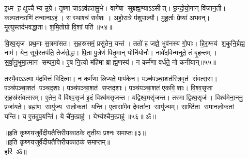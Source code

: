    इ॒ध्म ह॒ क्षुच्चैभ्य उ॒ग्रे।
   तृ॒ष्णा चाऽऽव॑हतामु॒भे।
   वागे॑षा सुब्रह्म॒ण्याऽऽसीत्।
   छ॒न्दो॒यो॒गान् वि॑जान॒ती।
   क॒ल्प॒त॒न्त्राणि॑ तन्वा॒नाऽह॑।
   स॒स्थाश्च॑ सर्व॒शः ।
   अ॒हो॒रा॒त्रे प॑शुपा॒ल्यौ।
   मु॒हू॒र्ताः प्रे॒ष्या॑ अभवन्।
   मृ॒त्युस्तद॑भवद्धा॒ता।
   श॒मि॒तोग्रो वि॒शां पति॑॥५४॥

   वि॒श्व॒सृज॑ प्रथ॒माः स॒त्रमा॑सत।
   स॒हस्र॑समं॒ प्रसु॑तेन॒ यन्त॑।
   ततो॑ ह जज्ञे॒ भुव॑नस्य गो॒पाः।
   हि॒र॒ण्मय॑ श॒कुनि॒र्ब्रह्म॒ नाम॑।
   येन॒ सूर्य॒स्तप॑ति॒ तेज॑से॒द्धः।
   पि॒ता पु॒त्रेण॑ पितृ॒मान् योनि॑योनौ।
   नावे॑दविन्मनुते॒ तं बृ॒हन्तम्।
   स॒र्वा॒नु॒भुमा॒त्मान सम्परा॒ये।
   ए॒ष नि॒त्यो म॑हि॒मा ब्राह्म॒णस्य॑।
   न कर्म॑णा वर्धते॒ नो कनी॑यान्॥५५॥

   तस्यै॒वाऽऽत्मा प॑द॒वित्तं वि॑दित्वा।
   न कर्म॑णा लिप्यते॒ पाप॑केन।
   पञ्च॑पञ्चा॒शत॑स्त्रि॒वृत॑ संवत्स॒राः।
   पञ्च॑पञ्चा॒शत॑ पञ्चद॒शाः।
   पञ्च॑पञ्चा॒शत॑ सप्तद॒शाः।
   पञ्च॑पञ्चा॒शत॑ एकवि॒शाः।
   वि॒श्व॒सृजा स॒हस्र॑संवत्सरम्।
   ए॒तेन॒ वै वि॑श्व॒सृज॑ इ॒दं विश्व॑मसृजन्त।
   यद्विश्व॒मसृ॑जन्त।
   तस्माद्विश्व॒सृज॑।
   विश्व॑मेना॒ननु॒ प्रजा॑यते।
   ब्रह्म॑ण॒ सायु॑ज्य सलो॒कतां यन्ति।
   ए॒तासा॑मे॒व दे॒वता॑ना॒ सायु॑ज्यम्।
   सा॒र्ष्टिता समानलो॒कतां यन्ति।
   य ए॒तदु॑प॒यन्ति॑।
   ये चै॑न॒त्प्राहु॑।
   येभ्य॑श्चैन॒त्प्राहु॑॥५६॥
 ॐ॥
   \anuvakamend

      \begin{center}
॥इति कृष्णयजुर्वेदीयतैत्तिरीयकाठके तृतीयः प्रश्नः समाप्तः॥३॥\\
॥इति कृष्णयजुर्वेदीयतैत्तिरीयकाठकं समाप्तम्॥\\
   हरि॑  ॐ॥
\end{center}
